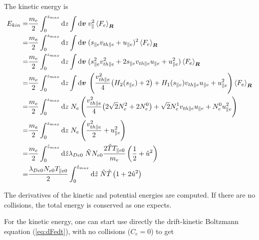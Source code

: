 \documentclass[final]{jpp}
\begin{document}
The kinetic energy is
\begin{align}
    E_{kin} =& \frac{m_e}{2} \int_0^{z_{max}}{\rm d}z \int{\rm d}\bm{v} \; v_{\parallel}^2  \left< F_e \right>_{\bm{R}} \nonumber \\
    =& \frac{m_e}{2} \int_0^{z_{max}}{\rm d}z \int{\rm d}\bm{v} \; (s_{\parallel e}v_{th \parallel e}+ u_{\parallel e})^2  \left< F_e \right>_{\bm{R}} \nonumber \\
    =& \frac{m_e}{2} \int_0^{z_{max}}{\rm d}z \int{\rm d}\bm{v} \; (s_{\parallel e}^2v_{th \parallel e}^2+ 2s_{\parallel e} v_{th \parallel e} u_{\parallel e}+ u_{\parallel e}^2)  \left< F_e \right>_{\bm{R}} \nonumber \\
    =& \frac{m_e}{2} \int_0^{z_{max}}{\rm d}z \int{\rm d}\bm{v} \; \left( \frac{v_{th \parallel e}^2}{4}\big(H_2(s_{\parallel e})+2\big)+ H_1(s_{\parallel e}) v_{th \parallel e} u_{\parallel e}+ u_{\parallel e}^2 \right)  \left< F_e \right>_{\bm{R}} \nonumber \\
    =& \frac{m_e}{2} \int_0^{z_{max}}{\rm d}z \; N_e\left( \frac{v_{th \parallel e}^2}{4}\big(2\sqrt{2}N_e^2 +2N_e^0\big)+  \sqrt{2}N_e^1 v_{th \parallel e} u_{\parallel e}+ N_e^0u_{\parallel e}^2 \right)  \nonumber \\
    =& \frac{m_e}{2} \int_0^{z_{max}}{\rm d}z \; N_e\left( \frac{v_{th \parallel e}^2}{2} + u_{\parallel e}^2 \right)  \nonumber \\
    =& \frac{m_e}{2} \int_0^{\hat{z}_{max}}{\rm d}\hat{z} \lambda_{De0} \; \hat{N}N_{e0} \frac{2\hat{T}T_{\parallel e 0}}{m_e} \left( \frac{1}{2} + \hat{u}^2 \right)  \nonumber \\
    =& \frac{\lambda_{De0} N_{e0} T_{\parallel e 0}}{2} \int_0^{\hat{z}_{max}}{\rm d}\hat{z}\; \hat{N} \hat{T} \left( 1 + 2\hat{u}^2 \right) \label{eq:Ekin}
\end{align}{}

The derivatives of the kinetic and potential energies are computed. If there are no collisions, the total energy is conserved as one expects.

For the kinetic energy, one can start use directly the drift-kinetic Boltzmann equation (\ref{eq:dFedt}), with no collisions ($C_e=0$) to get 
\end{document}
